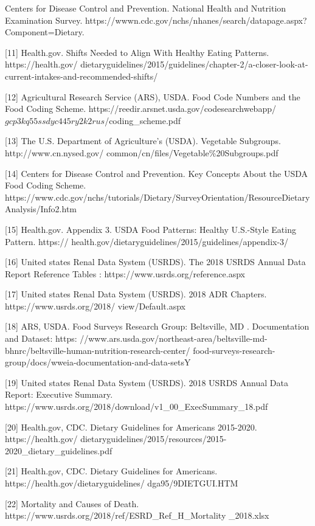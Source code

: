 \begin{flushleft}
\noindent [10]	Centers for Disease Control and Prevention. National Health and Nutrition Examination Survey. https://wwwn.cdc.gov/nchs/nhanes/search/datapage.aspx?Component=Dietary. 

[11]	Health.gov. Shifts Needed to Align With Healthy Eating Patterns. https://health.gov/
dietaryguidelines/2015/guidelines/chapter-2/a-closer-look-at-current-intakes-and-recommended-shifts/

[12]	Agricultural Research Service (ARS), USDA. Food Code Numbers and the Food Coding Scheme. 
https://reedir.arsnet.usda.gov/codesearchwebapp/\(gcp3kq55ssdyc445ry2k2rus\)/coding\_scheme.pdf 

[13]	The U.S. Department of Agriculture’s (USDA). Vegetable Subgroups. http://www.cn.nysed.gov/
common/cn/files/Vegetable\%20Subgroups.pdf 

[14]	Centers for Disease Control and Prevention. Key Concepts About the USDA Food Coding Scheme.
https://www.cdc.gov/nchs/tutorials/Dietary/SurveyOrientation/ResourceDietaryAnalysis/Info2.htm 

[15]	Health.gov. Appendix 3. USDA Food Patterns: Healthy U.S.-Style Eating Pattern. https://
health.gov/dietaryguidelines/2015/guidelines/appendix-3/

[16]	United states Renal Data System (USRDS). The 2018 USRDS Annual Data Report Reference Tables
: https://www.usrds.org/reference.aspx

[17]	United states Renal Data System (USRDS). 2018 ADR Chapters. https://www.usrds.org/2018/
view/Default.aspx

[18]	ARS, USDA. Food Surveys Research Group: Beltsville, MD . Documentation and Dataset: https:
//www.ars.usda.gov/northeast-area/beltsville-md-bhnrc/beltsville-human-nutrition-research-center/
food-surveys-research-group/docs/wweia-documentation-and-data-setsY

[19]	United states Renal Data System (USRDS). 2018 USRDS Annual Data Report: Executive Summary. 
https://www.usrds.org/2018/download/v1\_00\_ExecSummary\_18.pdf

[20]	Health.gov, CDC. Dietary  Guidelines  for Americans  2015-2020. https://health.gov/
dietaryguidelines/2015/resources/2015-2020\_dietary\_guidelines.pdf 

[21]	Health.gov, CDC. Dietary  Guidelines  for Americans. https://health.gov/dietaryguidelines/
dga95/9DIETGUI.HTM

[22]	Mortality and Causes of Death. https://www.usrds.org/2018/ref/ESRD\_Ref\_H\_Mortality
\_2018.xlsx


\end{flushleft}
